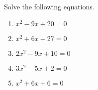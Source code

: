 \documentclass{article}
\begin{document}
\HomeworkTitle[class={College Algebra}, number={2}, name={Quadratic Equations}]

Solve the following equations.

\begin{enumerate}
\item $x^2 - 9x + 20 = 0$

   \vspace{4cm}

\item $x^2 + 6x - 27 = 0$

   \vspace{4cm}

\item $2x^2 - 9x + 10 = 0$

   \vspace{4cm}

\item $3x^2 - 5x + 2 = 0$

   \vspace{4cm}

\item 

$x^2 + 6x + 6 = 0$

  
\end{enumerate}
\end{document}
